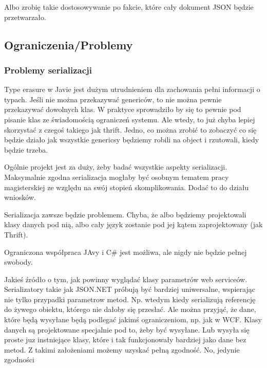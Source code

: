 Albo zrobię takie dostosowywanie po fakcie, które cały dokument JSON będzie przetwarzało.


\subsection{Ograniczenia/Problemy}
\subsubsection{Problemy serializacji}
Type erasure w Javie jest dużym utrudnieniem dla zachowania pełni informacji o typach.
Jeśli nie można przekazywać genericów, to nie można pewnie przekazywać dowolnych klas. W praktyce sprowadziło by się to pewnie pod pisanie klas ze świadomością ograniczeń systemu. Ale wtedy, to już chyba lepiej skorzystać z czegoś takiego jak thrift.
Jedno, co można zrobić to zobaczyć co się będzie działo jak wszystkie genericsy będziemy robili na object i rzutowali, kiedy będzie trzeba.

Ogólnie projekt jest za duży, żeby badać wszystkie aspekty serializacji. Maksymalnie zgodna serializacja mogłaby być osobnym tematem pracy magisterskiej ze względu na swój stopień skomplikowania.
Dodać to do działu wniosków.

Serializacja zawsze będzie problemem. Chyba, że albo będziemy projektowali klasy danych pod nią, albo cały język zostanie pod jej kątem zaprojektowany (jak Thrift).

Ograniczona współpraca JAvy i C\# jest możliwa, ale nigdy nie będzie pełnej swobody.

Jakieś źródło o tym, jak powinny wyglądać klasy parametrów web serviceów.
Serializatory takie jak JSON.NET próbują być bardziej uniwersalne, wspierając nie tylko przypadki parametrow metod. Np. wtedym kiedy serializują referencję do żywego obiektu, którego nie dałoby się przesłać.
Ale można przyjąć, że dane, które będą wysyłane będą podlegać jakimś ograniczeniom, np. jak w WCF. Klasy danych są projektowane specjalnie pod to, żeby być wysyłane. Lub wysyła się proste juz instniejące klasy, które i tak funkcjonowały bardziej jako dane bez metod.
Z takimi założeniami możemy uzyskać pełną zgodność. No, jedynie zgodności

